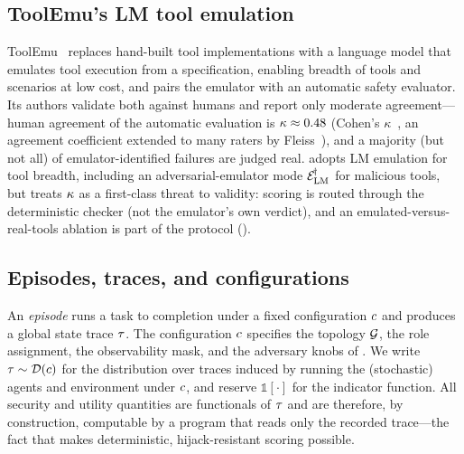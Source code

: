 \subsection{ToolEmu's LM tool emulation}
ToolEmu~\cite{ruan2024toolemu} replaces hand-built tool implementations with a language
model that emulates tool execution from a specification, enabling breadth of tools and
scenarios at low cost, and pairs the emulator with an automatic safety evaluator. Its
authors validate both against humans and report only moderate agreement---human
agreement of the automatic evaluation is $\kappa\approx0.48$ (Cohen's $\kappa$~\cite{cohen1960coefficient},
an agreement coefficient extended to many raters by Fleiss~\cite{fleiss1971measuring}), and a
majority (but not all) of emulator-identified failures are judged real.  adopts LM emulation for
tool breadth, including an adversarial-emulator mode $\mathcal{E}_{\mathrm{LM}}^{\!\dagger}$ for malicious
tools, but treats $\kappa$ as a first-class threat to validity: scoring is routed
through the deterministic checker (not the emulator's own verdict), and an
emulated-versus-real-tools ablation is part of the protocol ().

\subsection{Episodes, traces, and configurations}
An \emph{episode} runs a task to completion under a fixed configuration $c$ and
produces a global state trace $\tau$. The configuration $c$ specifies the
topology $\mathcal{G}$, the role assignment, the observability mask, and the adversary knobs
of . We write $\tau\sim\mathcal{D}(c)$ for the distribution
over traces induced by running the (stochastic) agents and environment under $c$,
and reserve $\mathbb{1}[\cdot]$ for the indicator function. All security and utility
quantities are functionals of $\tau$ and are therefore, by construction, computable
by a program that reads only the recorded trace---the fact that makes deterministic,
hijack-resistant scoring possible.
